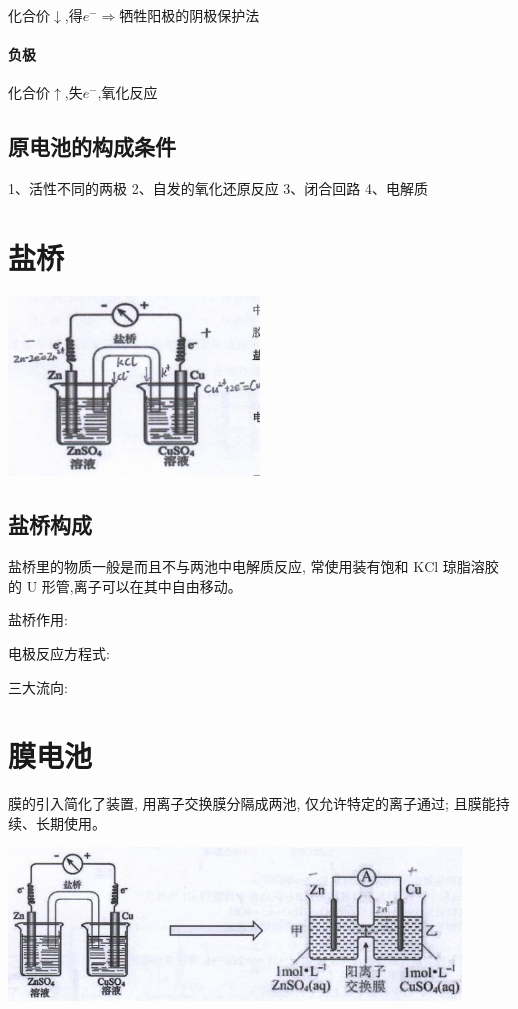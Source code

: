 \documentclass[10pt,cn]{elegantbook}
\begin{document}
化合价$\downarrow$,得$e^{-}$$\Rightarrow$牺牲阳极的阴极保护法

\paragraph*{负极}

化合价$\uparrow$,失$e^{-}$,氧化反应

\subsection{原电池的构成条件}

1、活性不同的两极 
2、自发的氧化还原反应
3、闭合回路 
4、电解质

\section{盐桥}

\begin{center}
	\includegraphics[max width=0.5\textwidth]{image/c14.jpg}
\end{center}

\subsection{盐桥构成}

盐桥里的物质一般是而且不与两池中电解质反应, 常使用装有饱和 \(\mathrm{{KCl}}\) 琼脂溶胶的 \(\mathrm{U}\) 形管,离子可以在其中自由移动。

盐桥作用:

电极反应方程式: 

三大流向: 

\section{膜电池}

膜的引入简化了装置, 用离子交换膜分隔成两池, 仅允许特定的离子通过; 且膜能持续、长期使用。

\begin{center}
	\includegraphics[max width=0.9\textwidth]{image/c16-1.jpg}
\end{center}
\end{document}
